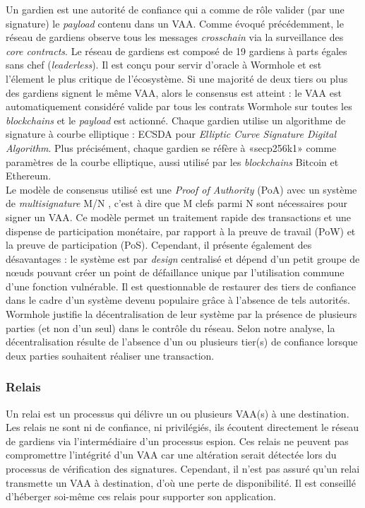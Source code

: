 Un gardien \cite{wormholeGuardian} est une autorité de confiance qui a comme de rôle valider 
(par une signature) le \textit{payload} contenu dans un VAA.
Comme évoqué précédemment, le réseau de gardiens observe tous les messages \textit{crosschain} via la 
surveillance des \textit{core contracts}.
Le réseau de gardiens est composé de 19 gardiens à parts égales sans chef (\textit{leaderless}).
Il est conçu pour servir d'oracle à Wormhole et est l'élement le plus critique de l'écosystème.
Si une majorité de deux tiers ou plus des gardiens signent le même VAA, alors le consensus est atteint : 
le VAA est automatiquement considéré valide par  tous les contrats Wormhole sur toutes les 
\textit{blockchains} et le \textit{payload} est actionné. 
Chaque gardien utilise un algorithme de signature à courbe elliptique : ECSDA pour 
\textit{Elliptic Curve Signature Digital Algorithm}.
Plus précisément, chaque gardien se réfère à «secp256k1» comme paramètres de la courbe elliptique, 
aussi utilisé par les \textit{blockchains} Bitcoin et Ethereum.\\
Le modèle de consensus utilisé est une \textit{Proof of Authority} (PoA) avec un système de 
\textit{multisignature} M/N \cite{wormholeChainswap}, c'est à dire que M clefs parmi N sont nécessaires 
pour signer un VAA. Ce modèle permet un traitement rapide des transactions et une dispense de participation monétaire, par rapport à la preuve de travail (PoW) et la preuve 
de participation (PoS). Cependant, il présente également des désavantages : le système est par 
\textit{design} centralisé et dépend d'un petit groupe de nœuds pouvant créer un point de 
défaillance unique par l'utilisation commune d'une fonction vulnérable. Il est questionnable de restaurer des tiers de confiance dans le cadre d'un système 
devenu populaire grâce à l'absence de tels autorités. Wormhole justifie la décentralisation de leur 
système \cite{wormholeGuardian} par la présence de plusieurs parties (et non d'un seul) dans le contrôle du réseau.
Selon notre analyse, la décentralisation résulte de l'absence d'un ou plusieurs tier(s) de confiance lorsque deux parties 
souhaitent réaliser une transaction.
\newpage

\subsubsection{Relais}

Un relai \cite{wormholeRelayer} est un processus qui délivre un ou plusieurs VAA(s) à une destination.
Les relais ne sont ni de confiance, ni privilégiés, ils écoutent directement le réseau de gardiens 
via l'intermédiaire d'un processus espion. Ces relais ne peuvent pas compromettre l'intégrité d'un VAA 
car une altération serait détectée lors du processus de vérification des signatures. Cependant, il n'est 
pas assuré qu'un relai transmette un VAA à destination, d'où une perte de disponibilité. Il est conseillé
d'héberger soi-même ces relais pour supporter son application.

